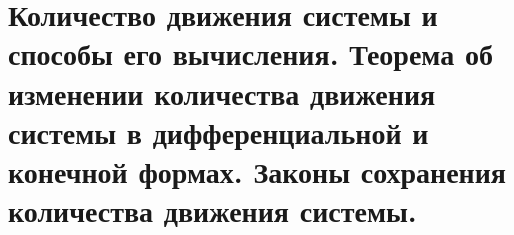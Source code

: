 \chapter{Количество движения системы и способы его вычисления. Теорема об
изменении количества движения системы в дифференциальной и конечной
формах. Законы сохранения количества движения системы.}

\newpage
